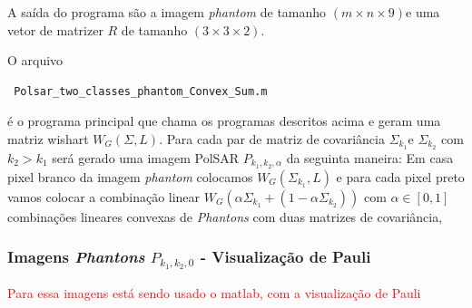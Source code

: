 \documentclass[12pt,a4paper]{article}
\begin{document}
A saída do programa são a imagem {\it phantom} de tamanho $(m\times n \times 9)$e uma vetor de matrizer $R$ de tamanho $(3 \times 3 \times 2)$.


O arquivo \begin{verbatim} Polsar_two_classes_phantom_Convex_Sum.m \end{verbatim} é o programa principal que chama os programas descritos acima e geram uma matriz wishart $W_G(\Sigma,L)$. Para cada par de matriz de covariância $\Sigma_{k_1}$e $\Sigma_{k_2}$ com $k_2>k_1$ será gerado uma imagem PolSAR $P_{k_1,k_2,\alpha}$ da seguinta maneira: Em casa pixel branco da imagem {\it phantom} colocamos $W_G(\Sigma_{k_1},L)$ e para cada pixel preto vamos colocar a combinação linear $W_G(\alpha\Sigma_{k_1}+(1-\alpha\Sigma_{k_2}))$ com $\alpha\in[0,1]$ combinações lineares convexas de {\it Phantons} com duas matrizes de covariância,  
 
\subsubsection{Imagens  {\it Phantons} $P_{k_1,k_2,0}$ - Visualização de Pauli} 


\textcolor{red}{Para essa imagens está sendo usado o matlab, com a visualização de Pauli}
\end{document}
